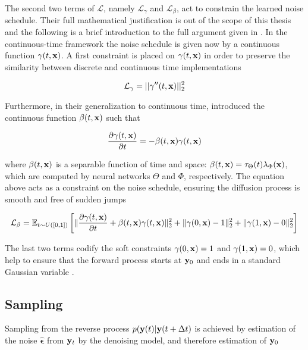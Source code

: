 The second two terms of $\mathcal{L}$, namely $\mathcal{L}_{\gamma}$ and $\mathcal{L}_{\beta}$, act to constrain the learned noise schedule. Their full mathematical justification is out of the scope of this thesis and the following is a brief introduction to the full argument given in \parencite{Maggiora2023}. In the continuous-time framework the noise schedule is given now by a continuous function $\gamma(t,\bold{x})$. A first constraint is placed on $\gamma(t,\bold{x})$ in order to preserve the similarity between discrete and continuous time implementations 

\begin{equation*}
\mathcal{L}_{\gamma} = \lvert\lvert \gamma''(t,\bold{x}) \lvert\lvert_{2}^{2}
\end{equation*}

Furthermore, in their generalization to continuous time, \parencite{Maggiora2023} introduced the continuous function $\beta(t,\bold{x})$ such that

\begin{equation*}
\frac{\partial \gamma(t,\bold{x})}{\partial t} = -\beta(t,\bold{x})\gamma(t,\bold{x})
\end{equation*}

where $\beta(t,\bold{x})$ is a separable function of time and space: $\beta(t,\bold{x}) = \tau_{\Theta}(t)\lambda_{\Phi}(\bold{x})$, which are computed by neural networks $\Theta$ and $\Phi$, respectively. The equation above acts as a constraint on the noise schedule,    ensuring the diffusion process is smooth and free of sudden jumps

\begin{equation*}
\mathcal{L}_\beta = \mathbb{E}_{t \sim U([0,1])} \left[
\lVert \frac{\partial \gamma(t,\bold{x})}{\partial t} + \beta(t,\bold{x})\gamma(t,\bold{x}) \rVert_2^2
+ \lVert \gamma(0,\bold{x}) - 1 \rVert_2^2 
+ \lVert \gamma(1,\bold{x}) - 0 \rVert_2^2
\right]
\end{equation*}

The last two terms codify the soft constraints $\gamma(0,\bold{x})= 1$ and $\gamma(1,\bold{x}) = 0$, which help to ensure that the forward process starts at $\bold{y}_{0}$ and ends in a standard Gaussian variable \parencite{Maggiora2023}. 

\subsection{Sampling}

Sampling from the reverse process $p(\bold{y}(t)\lvert\bold{y}(t+\Delta t)$ is achieved by estimation of the noise $\hat{\boldsymbol{\epsilon}}$ from $\bold{y}_{t}$ by the denoising model, and therefore estimation of $\bold{y}_{0}$

